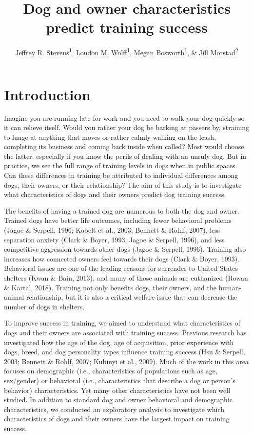 \documentclass[
  english,
  ,pub,floatsintext]{apa6}
\title{Dog and owner characteristics predict training success}
\author{Jeffrey R. Stevens\textsuperscript{1}, London M. Wolff\textsuperscript{1}, Megan Bosworth\textsuperscript{1}, \& Jill Morstad\textsuperscript{2}}
\date{}
\affiliation{\vspace{0.5cm}\textsuperscript{1} University of Nebraska-Lincoln\\\textsuperscript{2} Union College}
\begin{document}
\maketitle

\hypertarget{introduction}{%
\section{Introduction}\label{introduction}}

Imagine you are running late for work and you need to walk your dog quickly so it can relieve itself. Would you rather your dog be barking at passers by, straining to lunge at anything that moves or rather calmly walking on the leash, completing its business and coming back inside when called? Most would choose the latter, especially if you know the perils of dealing with an unruly dog. But in practice, we see the full range of training levels in dogs when in public spaces. Can these differences in training be attributed to individual differences among dogs, their owners, or their relationship? The aim of this study is to investigate what characteristics of dogs and their owners predict dog training success.

The benefits of having a trained dog are numerous to both the dog and owner. Trained dogs have better life outcomes, including fewer behavioral problems (Jagoe \& Serpell, 1996; Kobelt et al., 2003; Bennett \& Rohlf, 2007), less separation anxiety (Clark \& Boyer, 1993; Jagoe \& Serpell, 1996), and less competitive aggression towards other dogs (Jagoe \& Serpell, 1996). Training also increases how connected owners feel towards their dogs (Clark \& Boyer, 1993). Behavioral issues are one of the leading reasons for surrender to United States shelters (Kwan \& Bain, 2013), and many of those animals are euthanized (Rowan \& Kartal, 2018). Training not only benefits dogs, their owners, and the human-animal relationship, but it is also a critical welfare issue that can decrease the number of dogs in shelters.

To improve success in training, we aimed to understand what characteristics of dogs and their owners are associated with training success. Previous research has investigated how the age of the dog, age of acquisition, prior experience with dogs, breed, and dog personality types influence training success (Hsu \& Serpell, 2003; Bennett \& Rohlf, 2007; Kubinyi et al., 2009). Much of the work in this area focuses on demographic (i.e., characteristics of populations such as age, sex/gender) or behavioral (i.e., characteristics that describe a dog or person's behavior) characteristics. Yet many other characteristics have not been well studied. In addition to standard dog and owner behavioral and demographic characteristics, we conducted an exploratory analysis to investigate which characteristics of dogs and their owners have the largest impact on training success.
\end{document}
